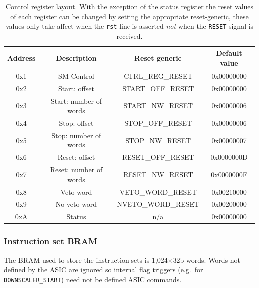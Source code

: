 \begin{table}[htbp]
  \begin{center}
    \begin{tabular}{c|c | c |c}
      Address & Description             & Reset generic      & Default value  \\
      \hline                    
      0x1     & SM-Control              & CTRL\_REG\_RESET   & 0x00000000     \\ 
      0x2     & Start: offset           & START\_OFF\_RESET  & 0x00000000     \\  
      0x3     & Start: number of words  & START\_NW\_RESET   & 0x00000006     \\ 
      0x4     & Stop: offset            & STOP\_OFF\_RESET   & 0x00000006     \\ 
      0x5     & Stop: number of words   & STOP\_NW\_RESET    & 0x00000007     \\ 
      0x6     & Reset: offset           & RESET\_OFF\_RESET  & 0x0000000D     \\ 
      0x7     & Reset: number of words  & RESET\_NW\_RESET   & 0x0000000F     \\ 
      0x8     & Veto word               & VETO\_WORD\_RESET  & 0x00210000     \\ 
      0x9     & No-veto word            & NVETO\_WORD\_RESET & 0x00200000     \\ 
      0xA     & Status                  & n/a                & 0x00000000     \\ 
    \end{tabular}
  \end{center}
  \caption{Control register layout. With the exception of the status register the reset values of each register can be changed by setting the appropriate reset-generic, these values only take affect when the \texttt{rst} line is asserted \emph{not} when the \texttt{RESET} signal is received.}
  \label{tab:ctrl_reg_default}
\end{table}

\subsubsection{Instruction set BRAM} %
\label{sub:tx_bram}
The BRAM used to store the instruction sets is 1,024\(\times\)32b words. Words not defined by the ASIC are ignored so internal flag triggers (e.g.\ for \texttt{DOWNSCALER\_START}) need not be defined ASIC commands.

